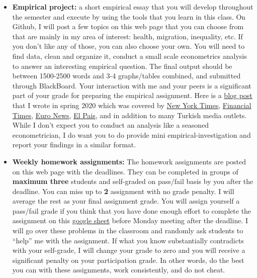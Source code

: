 \documentclass[
]{book}
\begin{document}
\begin{itemize}
  \begin{itemize}
  \item
    \textbf{Empirical project:} a short empirical essay that you will develop throughout the semester and execute by using the tools that you learn in this class. On Github, I will post a few topics on this web page that you can choose from that are mainly in my area of interest: health, migration, inequality, etc. If you don't like any of those, you can also choose your own. You will need to find data, clean and organize it, conduct a small scale econometrics analysis to answer an interesting empirical question. The final output should be between 1500-2500 words and 3-4 graphs/tables combined, and submitted through BlackBoard. Your interaction with me and your peers is a significant part of your grade for preparing the empirical assignment. Here is a \href{https://www.onuraltindag.info/pt-tr/posts/excess_mortality_eng/}{blog post} that I wrote in spring 2020 which was covered by \href{https://www.nytimes.com/2020/04/20/world/middleeast/coronavirus-turkey-deaths.html}{New York Times}, \href{https://www.ft.com/content/80bb222c-b6eb-40ea-8014-563cbe9e0117}{Financial Times}, \href{https://tr.euronews.com/2020/04/23/saglik-bakaninin-new-york-timesa-verdigi-yanit-olumlerdeki-artis-acikliyor-mu-covid-19}{Euro News}, \href{https://elpais.com/sociedad/2020-04-27/el-misterio-turco-uno-de-los-paises-con-mas-casos-de-covid-19-y-menos-muertes.html}{El Pais}, and in addition to many Turkish media outlets. While I don't expect you to conduct an analysis like a seasoned econometrician, I do want you to do provide mini empirical-investigation and report your findings in a similar format.\\
  \item
    \textbf{Weekly homework assignments:} The homework assignments are posted on this web page with the deadlines. They can be completed in groups of \textbf{maximum three} students and self-graded on pass/fail basis by you after the deadline. You can miss up to \textbf{2} assignment with no grade penalty. I will average the rest as your final assignment grade. You will assign yourself a pass/fail grade if you think that you have done enough effort to complete the assignment on this \href{Link\%20here}{google sheet} before Monday meeting after the deadline. I will go over these problems in the classroom and randomly ask students to ``help'' me with the assignment. If what you know substantially contradicts with your self-grade, I will change your grade to zero and you will receive a significant penalty on your participation grade. In other words, do the best you can with these assignments, work consistently, and do not cheat.

\end{itemize}
\end{itemize}
\end{document}
